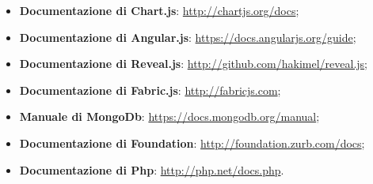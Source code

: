 \begin{itemize}
\begin{itemize}
\begin{itemize}
\begin{itemize}
						\end{itemize}
					\end{itemize}
					\item \textbf{Documentazione di Chart.js}: \url{http://chartjs.org/docs};
					\item \textbf{Documentazione di Angular.js}: \url{https://docs.angularjs.org/guide};
					\item \textbf{Documentazione di Reveal.js}: \url{http://github.com/hakimel/reveal.js};
					\item \textbf{Documentazione di Fabric.js}: \url{http://fabricjs.com};
					\item \textbf{Manuale di MongoDb}: \url{https://docs.mongodb.org/manual};
					\item \textbf{Documentazione di Foundation}: \url{http://foundation.zurb.com/docs};
					\item \textbf{Documentazione di Php}: \url{http://php.net/docs.php}.
				\end{itemize}

	\end{itemize}
